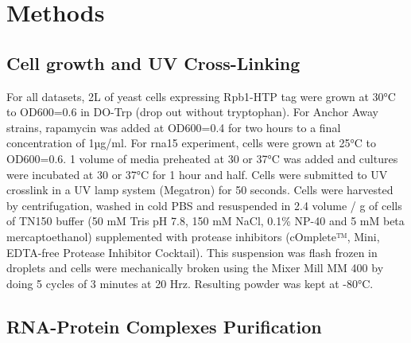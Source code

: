 \chapter*{\textbf{Methods}}



\section*{Cell growth and UV Cross-Linking}

For all datasets, 2L of yeast cells expressing Rpb1-HTP tag were grown at 30°C to OD600=0.6 in DO-Trp (drop out without tryptophan). For Anchor Away strains, rapamycin was added at OD600=0.4 for two hours to a final concentration of 1µg/ml. For rna15 experiment, cells were grown at 25°C to OD600=0.6. 1 volume of media preheated at 30 or 37°C was added and cultures were incubated at 30 or 37°C for 1 hour and half. Cells were submitted to UV crosslink in a UV lamp system (Megatron) for 50 seconds. Cells were harvested by centrifugation, washed in cold PBS and resuspended in 2.4 volume / g of cells of TN150 buffer (50 mM Tris pH 7.8, 150 mM NaCl, 0.1\% NP-40 and 5 mM beta mercaptoethanol) supplemented with protease inhibitors (cOmplete™, Mini, EDTA-free Protease Inhibitor Cocktail). This suspension was flash frozen in droplets and cells were mechanically broken using the Mixer Mill MM 400 by doing 5 cycles of 3 minutes at 20 Hrz. Resulting powder was kept at -80°C. 

\section*{RNA-Protein Complexes Purification}

